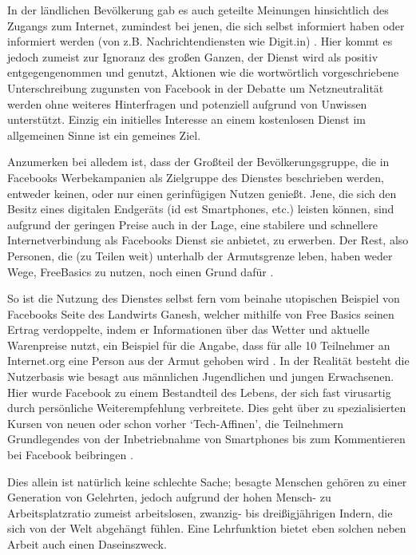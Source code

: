 \documentclass{article}
\begin{document}
\medskip

In der ländlichen Bevölkerung gab es auch geteilte Meinungen hinsichtlich des Zugangs zum Internet, zumindest bei jenen, die sich selbst informiert haben oder informiert werden (von z.B. Nachrichtendiensten wie Digit.in) \parencite{digitYT}.
Hier kommt es jedoch zumeist zur Ignoranz des großen Ganzen, der Dienst wird als positiv entgegengenommen und genutzt, Aktionen wie die wortwörtlich vorgeschriebene Unterschreibung zugunsten von Facebook in der Debatte um Netzneutralität\autocite{ndtvYT} werden ohne weiteres Hinterfragen und potenziell aufgrund von Unwissen unterstützt.
Einzig ein initielles Interesse an einem kostenlosen Dienst im allgemeinen Sinne ist ein gemeines Ziel.

\medskip

Anzumerken bei alledem ist, dass der Großteil der Bevölkerungsgruppe, die in Facebooks Werbekampanien als Zielgruppe des Dienstes beschrieben werden, entweder keinen, oder nur einen gerinfügigen Nutzen genießt.
Jene, die sich den Besitz eines digitalen Endgeräts (id est Smartphones, etc.) leisten können, sind aufgrund der geringen Preise auch in der Lage, eine stabilere und schnellere Internetverbindung als Facebooks Dienst sie anbietet, zu erwerben.
Der Rest, also Personen, die (zu Teilen weit) unterhalb der Armutsgrenze leben, haben weder Wege, FreeBasics zu nutzen, noch einen Grund dafür \parencite[257]{everydayLife}.

\medskip

So ist die Nutzung des Dienstes selbst fern vom beinahe utopischen Beispiel von Facebooks Seite des Landwirts Ganesh, welcher mithilfe von Free Basics seinen Ertrag verdoppelte, indem er Informationen über das Wetter und aktuelle Warenpreise nutzt, ein Beispiel für die Angabe, dass für alle 10 Teilnehmer an Internet.org eine Person aus der Armut gehoben wird \parencite[4]{prasad2017}.
In der Realität besteht die Nutzerbasis wie besagt aus männlichen Jugendlichen und jungen Erwachsenen.
Hier wurde Facebook zu einem Bestandteil des Lebens, der sich fast virusartig durch persönliche Weiterempfehlung verbreitete.
Dies geht über zu spezialisierten Kursen von neuen oder schon vorher `Tech-Affinen', die Teilnehmern Grundlegendes von der Inbetriebnahme von Smartphones bis zum Kommentieren bei Facebook beibringen \parencite{empowermentThroughFacebook}.

\medskip

Dies allein ist natürlich keine schlechte Sache; besagte Menschen gehören zu einer Generation von Gelehrten, jedoch aufgrund der hohen Mensch- zu Arbeitsplatzratio zumeist arbeitslosen, zwanzig- bis dreißigjährigen Indern, die sich von der Welt abgehängt fühlen.
Eine Lehrfunktion bietet eben solchen neben Arbeit auch einen Daseinszweck.
\end{document}
